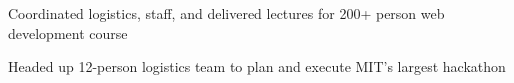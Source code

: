 
\hfill {}
\begin{tightemize}
    \item Coordinated logistics, staff, and delivered lectures for 200+ person web development course
\end{tightemize}
\sectionsep


\hfill {}
\begin{tightemize}
    \item Headed up 12-person logistics team to plan and execute MIT's largest hackathon 
\end{tightemize}
\sectionsep


